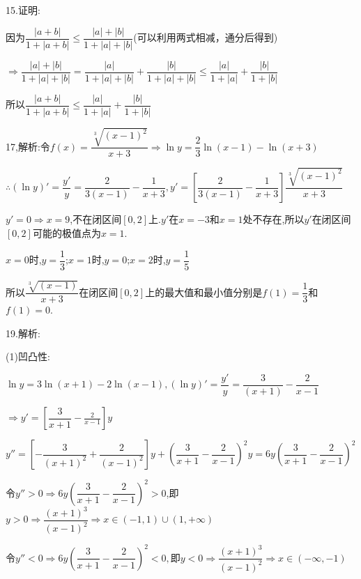 15.证明:

因为$\dfrac{{\left| {a + b} \right|}}{{1 + \left| {a + b} \right|}} \le \dfrac{{\left| a \right| + \left| b \right|}}{{1 + \left| a \right| + \left| b \right|}}$(可以利用两式相减，通分后得到)

$ \Rightarrow \dfrac{{\left| a \right| + \left| b \right|}}{{1 + \left| a \right| + \left| b \right|}} = \dfrac{{\left| a \right|}}{{1 + \left| a \right| + \left| b \right|}} + \dfrac{{\left| b \right|}}{{1 + \left| a \right| + \left| b \right|}} \le \dfrac{{\left| a \right|}}{{1 + \left| a \right|}} + \dfrac{{\left| b \right|}}{{1 + \left| b \right|}}$

所以$\dfrac{{\left| {a + b} \right|}}{{1 + \left| {a + b} \right|}} \le \dfrac{{\left| a \right|}}{{1 + \left| a \right|}} + \dfrac{{\left| b \right|}}{{1 + \left| b \right|}}$

17,解析:令$f(x) = \dfrac{{\sqrt[3]{{{{(x - 1)}^2}}}}}{{x + 3}} \Rightarrow \ln y = \dfrac{2}{3}\ln (x - 1) - \ln (x + 3)$

$\therefore (\ln y)' = \dfrac{{y'}}{y} = \dfrac{2}{{3(x - 1)}} - \dfrac{1}{{x + 3}},y' = [\dfrac{2}{{3(x - 1)}} - \dfrac{1}{{x + 3}}]\dfrac{{\sqrt[3]{{{{(x - 1)}^2}}}}}{{x + 3}}$

$y' = 0 \Rightarrow x = 9$,不在闭区间$[0,2]$上.$y'$在$x = - 3$和$x = 1$处不存在,所以$y'$在闭区间$[0,2]$可能的极值点为$x = 1$.

$x = 0$时,$y = \dfrac{1}{3}$;$x = 1$时,$y = 0$;$x = 2$时,$y = \dfrac{1}{5}$

所以$\dfrac{{\sqrt[3]{{(x - 1)}}}}{{x + 3}}$在闭区间$[0,2]$上的最大值和最小值分别是$f(1) = \dfrac{1}{3}$和$f(1) = 0$.

19.解析:

(1)凹凸性:

$\ln y = 3\ln (x + 1) - 2\ln (x - 1),(\ln y)' = \dfrac{{y'}}{y} = \dfrac{3}{{(x + 1)}} - \dfrac{2}{{x - 1}}$

$ \Rightarrow y' = [\dfrac{3}{{x + 1}} - \frac{2}{{x - 1}}]y$

$y'' = [ - \dfrac{3}{{{{(x + 1)}^2}}} + \dfrac{2}{{{{(x - 1)}^2}}}]y + {(\dfrac{3}{{x + 1}} - \dfrac{2}{{x - 1}})^2}y = 6y{(\dfrac{3}{{x + 1}} - \dfrac{2}{{x - 1}})^2}$

令$y'' > 0 \Rightarrow 6y{(\dfrac{3}{{x + 1}} - \dfrac{2}{{x - 1}})^2} > 0$,即$y > 0 \Rightarrow \dfrac{{{{(x + 1)}^3}}}{{{{(x - 1)}^2}}} \Rightarrow x \in ( - 1,1) \cup (1, + \infty )$

令$y'' < 0 \Rightarrow 6y{(\dfrac{3}{{x + 1}} - \dfrac{2}{{x - 1}})^2} < 0,$即$y < 0 \Rightarrow \dfrac{{{{(x + 1)}^3}}}{{{{(x - 1)}^2}}} \Rightarrow x \in ( - \infty , - 1)$

